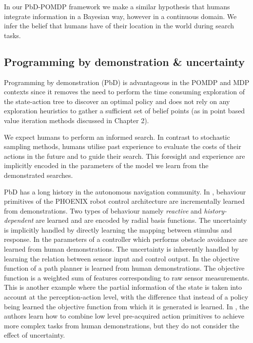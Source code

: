 In our PbD-POMDP framework we make a similar hypothesis that humans integrate information in a Bayesian way, however in a 
continuous domain. We infer the belief that humans have of their location in the world during search tasks.


\subsection{Programming by demonstration \& uncertainty}

Programming by demonstration (PbD) is advantageous in the POMDP and MDP contexts since it removes the need to perform the time 
consuming exploration of the state-action tree to discover an optimal policy and does not rely on any exploration 
heuristics to gather a sufficient set of belief points (as in point based value iteration methods discussed in Chapter 2).

We expect humans to perform an informed search. In contrast to stochastic sampling methods, 
humans utilise past experience to evaluate the costs of their actions in the future and to guide their search. This foresight and experience are implicitly encoded 
in the parameters of the model we learn from the demonstrated searches.

PbD has a long history in the autonomous navigation community. In \cite{Kasper2001153}, behaviour primitives of 
the PHOENIX robot control architecture are incrementally 
learned from demonstrations. Two types of behaviour namely \textit{reactive} and \textit{history-dependent} are 
learned and are encoded by radial basis functions. The
uncertainty is implicitly handled by directly learning the mapping between stimulus and response. In \cite{Hamner_2006_5810} the parameters of a
controller which performs obstacle avoidance are learned from human demonstrations. The uncertainty is inherently handled 
by learning the relation between sensor input and control output. In \cite{LfD_Autonomous_Navigation_in_Complex_Unstructured_Terrain} the objective function of a path planner is learned from human demonstrations. 
The objective function is a weighted sum of features corresponding to raw sensor measurements. This is another example where the partial information of the state is 
taken into account at the perception-action level, with the difference that instead of a policy being learned the objective function from which it is generated is learned. 
In \cite{Nicolescu01learningand}, the authors learn how to combine low level pre-acquired action 
primitives to achieve more complex tasks from human demonstrations, but 
they do not consider the effect of uncertainty.

